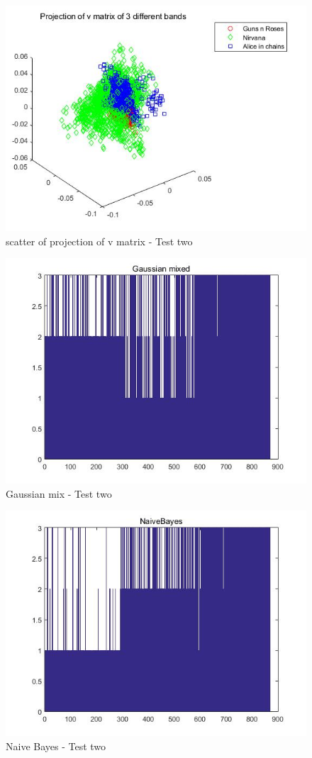\documentclass[12pt,letterpaper]{article}
\begin{document}
\begin{figure}[h]
	\centering
	\includegraphics[width=5.0in]{p7}
	\caption{scatter of projection of v matrix - Test two}
\end{figure}

\begin{figure}[h]
	\centering
	\includegraphics[width=5.0in]{p8}
	\caption{Gaussian mix - Test two}
\end{figure}
\begin{figure}[h]
	\centering
	\includegraphics[width=5.0in]{p9}
	\caption{Naive Bayes - Test two}
\end{figure}
\end{document}
